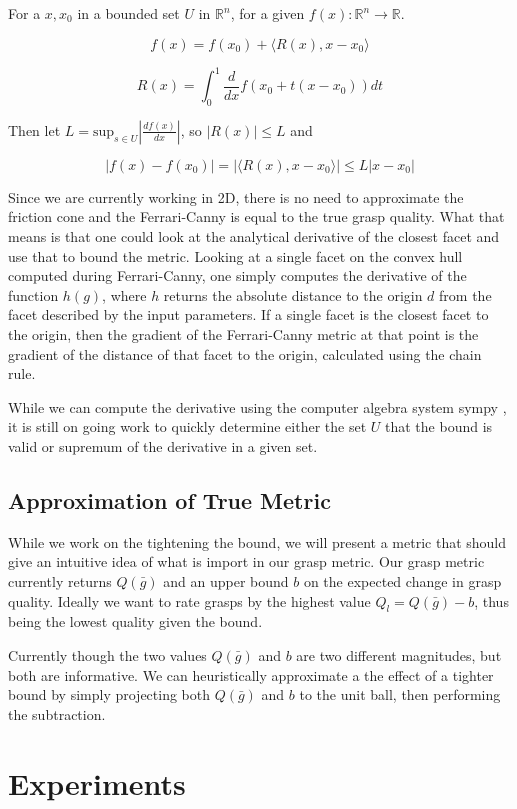 \documentclass[letterpaper, 10 pt, conference]{ieeeconf}  %
\begin{document}
For a $x,x_0$ in a bounded set $U$ in $\mathbb{R}^n$, for a given $f(x):\mathbb{R}^n \rightarrow \mathbb{R}$. 

\[
  f(x) = f(x_0) + \langle R(x),x-x_0 \rangle
\]

\[
  R(x) = \int_0^1 \frac{d}{dx}f(x_0+t(x-x_0)) dt
\]

Then let $L = \mbox{sup}_{s \in U} |\frac{df(x)}{dx} |$, so $|R(x)| \leq L$ and 

\[
  |f(x)-f(x_0)| = |\langle R(x),x-x_0 \rangle| \leq L |x-x_0|
\]


Since we are currently working in 2D, there is no need to approximate the friction cone and the Ferrari-Canny is equal to the true grasp quality. What that means is that one could look at the analytical derivative of the closest facet and use that to bound the metric. Looking at a single facet on the convex hull computed during Ferrari-Canny, one simply computes the derivative of the function $h(g)$, where $h$ returns the absolute distance to the origin $d$ from the facet described by
the input parameters. If a single facet is the closest facet to the origin, then the gradient of the Ferrari-Canny metric at that point is the gradient of the distance of that facet to the origin, calculated using the chain rule.

While we can compute the derivative using the computer algebra system sympy \cite{SymPy}, it is still on going work to quickly determine either the set $U$ that the bound is valid or supremum of the derivative in a given set.    

\subsection{Approximation of True Metric}
While we work on the tightening the bound, we will present a metric that should give an intuitive idea of what is import in our grasp metric. Our grasp metric currently returns $Q(\bar{g})$ and an upper bound $b$ on the expected change in grasp quality. Ideally we want to rate grasps by the highest value $Q_l = Q(\bar{g}) - b$, thus being the lowest quality given the bound. 

Currently though the two values $Q(\bar{g})$ and $b$ are two different magnitudes, but both are informative. We can heuristically approximate a the effect of a tighter bound by simply projecting both $Q(\bar{g})$ and $b$ to the unit ball, then performing the subtraction. 

\section{Experiments}
\end{document}
